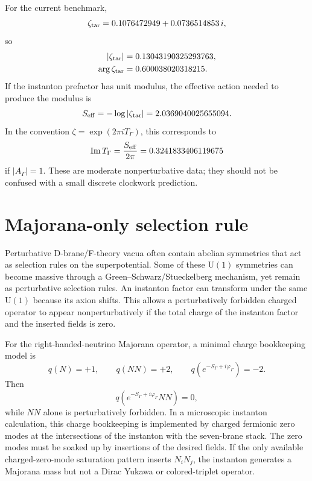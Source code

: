 \documentclass[11pt]{article}
\newcommand{\U}{\mathrm{U}}
\begin{document}
For the current benchmark,
\begin{equation}
  \zeta_{\rm tar}=0.1076472949+0.0736514853\,i,
\end{equation}
so
\begin{align}
  |\zeta_{\rm tar}|&=0.13043190325293763,\\
  \arg\zeta_{\rm tar}&=0.600038020318215.
\end{align}
If the instanton prefactor has unit modulus, the effective action needed to
produce the modulus is
\begin{equation}
  S_{\rm eff}=-\log|\zeta_{\rm tar}|
  =
  2.0369040025655094.
  \label{eq:seff}
\end{equation}
In the convention \(\zeta=\exp(2\pi iT_\Gamma)\), this corresponds to
\begin{equation}
  \operatorname{Im}T_\Gamma
  =
  \frac{S_{\rm eff}}{2\pi}
  =
  0.3241833406119675
\end{equation}
if \(|A_\Gamma|=1\).  These are moderate nonperturbative data; they should not
be confused with a small discrete clockwork prediction.

\section{Majorana-only selection rule}

Perturbative D-brane/F-theory vacua often contain abelian symmetries that act
as selection rules on the superpotential.  Some of these \(\U(1)\) symmetries
can become massive through a Green--Schwarz/Stueckelberg mechanism, yet remain
as perturbative selection rules.  An instanton factor can transform under the
same \(\U(1)\) because its axion shifts.  This allows a perturbatively
forbidden charged operator to appear nonperturbatively if the total charge of
the instanton factor and the inserted fields is zero.

For the right-handed-neutrino Majorana operator, a minimal charge bookkeeping
model is
\begin{equation}
  q(N)=+1,\qquad q(NN)=+2,\qquad q(e^{-S_\Gamma+i\varphi_\Gamma})=-2.
\end{equation}
Then
\begin{equation}
  q\left(e^{-S_\Gamma+i\varphi_\Gamma}NN\right)=0,
\end{equation}
while \(NN\) alone is perturbatively forbidden.  In a microscopic instanton
calculation, this charge bookkeeping is implemented by charged fermionic zero
modes at the intersections of the instanton with the seven-brane stack.  The
zero modes must be soaked up by insertions of the desired fields.  If the only
available charged-zero-mode saturation pattern inserts \(N_iN_j\), the
instanton generates a Majorana mass but not a Dirac Yukawa or colored-triplet
operator.
\end{document}
